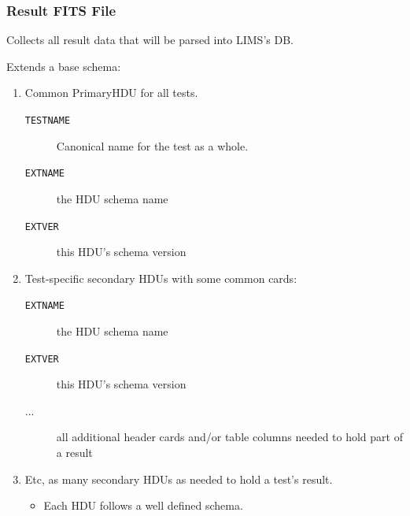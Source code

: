 \documentclass[xcolor=dvipsnames]{beamer}
\begin{document}
\begin{frame}
  \frametitle{Result FITS File}
  Collects all result data that will be parsed into LIMS's DB.

  \vspace{2mm}

  Extends a base schema:
  \begin{enumerate}
  \item Common PrimaryHDU for all tests.
    \begin{description}
    \item[\texttt{TESTNAME}] Canonical name for the test as a whole.
    \item[\texttt{EXTNAME}] the HDU schema name
    \item[\texttt{EXTVER}] this HDU's schema version
    \end{description}
  \item Test-specific secondary HDUs with some common cards:
    \begin{description}
    \item[\texttt{EXTNAME}] the HDU schema name
    \item[\texttt{EXTVER}] this HDU's schema version
    \item[...] all additional header cards and/or table columns needed
      to hold part of a result
    \end{description}
  \item Etc, as many secondary HDUs as needed to hold a test's result. 
    \begin{itemize}
    \item Each HDU follows a well defined schema.
    \end{itemize}
  \end{enumerate}


\end{frame}
\end{document}
